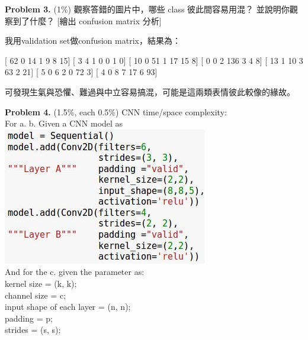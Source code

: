 \documentclass{article}
\begin{document}
\textbf{Problem 3.} (1\%) 觀察答錯的圖片中，哪些 class 彼此間容易用混？ 並說明你觀察到了什麼？ [繪出 confusion matrix 分析]

我用validation set做confusion matrix，結果為：

[ 62   0  14   1   9   8  15]
[  3   4   1   0   0   1   0]
[ 10   0  51   1  17  15   8]
[  0   0   2 136   3   4   8]
[ 13   1  10   3  63   2  21]
[  5   0   6   2   0  72   3]
[  4   0   8   7  17   6  93]

可發現生氣與恐懼、難過與中立容易搞混，可能是這兩類表情彼此較像的緣故。

\textbf{Problem 4.} (1.5\%, each 0.5\%) CNN time/space complexity:\\
For a. b. Given a CNN model as\\
\includegraphics[width=.5\textwidth]{image-000}\\
And for the c. given the parameter as: \\
kernel size = (k, k); \\
channel size = c; \\
input shape of each layer = (n, n); \\
padding = p; \\
strides = (s, s);
\end{document}
